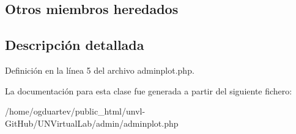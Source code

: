 \subsection*{Otros miembros heredados}


\subsection{Descripción detallada}


Definición en la línea 5 del archivo adminplot.\+php.



La documentación para esta clase fue generada a partir del siguiente fichero\+:\begin{DoxyCompactItemize}
\item 
/home/ogduartev/public\+\_\+html/unvl-\/\+Git\+Hub/\+U\+N\+Virtual\+Lab/admin/adminplot.\+php\end{DoxyCompactItemize}
